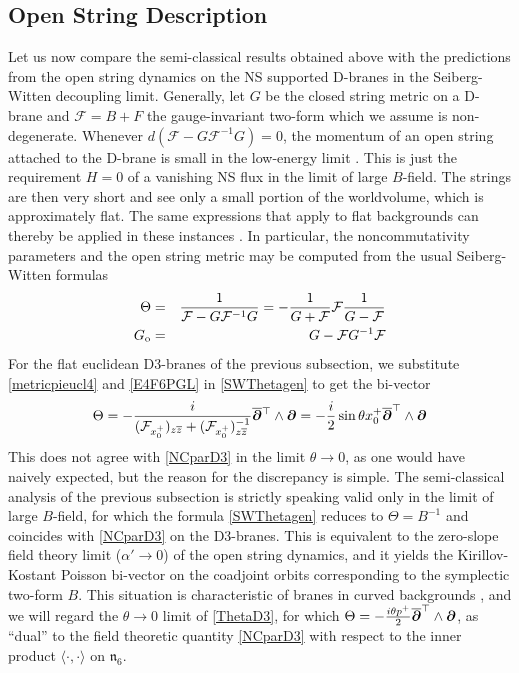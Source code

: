 \subsection{Open String Description}
\label{D3OSD}
Let us now compare the semi-classical results obtained above with the
predictions from the open string dynamics on the NS supported D-branes in the
Seiberg-Witten decoupling limit. Generally, let $G$ be the closed string metric
on a D-brane and $\mathcal{F}=B+F$ the gauge-invariant two-form which we assume
is non-degenerate. Whenever $ d(\mathcal{F}-G \mathcal{F}^{-1} G)=0$, the
momentum of an open string attached to the D-brane is small in the low-energy
limit \cite{HY1}. This is just the requirement $H=0$ of a vanishing NS flux in
the limit of large $B$-field. The strings are then very short and see only a
small portion of the worldvolume, which is approximately flat. The same
expressions that apply to flat backgrounds can thereby be applied in these
instances \cite{ARS1,HY1}. In particular, the noncommutativity parameters and
the open string metric may be computed from the usual Seiberg-Witten formulas
\cite{SW1}
\begin{eqnarray}
  \label{SWThetagen}
  \Theta&=&\frac1{\mathcal{F}-G \mathcal{F}^{-1} G} = -\frac1{G+\mathcal{F}}
  \mathcal{F} \frac1{G-\mathcal{F}}
  \\\label{SWopenmetgen}
  G_{\rm o}&=&G-\mathcal{F} G^{-1} \mathcal{F}
\end{eqnarray}
For the flat euclidean D3-branes of the previous subsection, we substitute
\eqref{metricpieucl4} and \eqref{E4F6PGL} in \eqref{SWThetagen} to get the
bi-vector
\begin{equation}
  \label{ThetaD3}
  \Theta=-\frac i{(\mathcal{F}_{x_0^+})_{z \overline{z}}+
    (\mathcal{F}_{x_0^+})^{-1}_{z \overline{z}}}
  \overline{{{\boldsymbol {\partial} }}}{}^{ \top}\wedge{{\boldsymbol {\partial} }}=
  -\frac i2 \sin\theta x_0^+ \overline{{{\boldsymbol {\partial} }}}^{ \top}
  \wedge{{\boldsymbol {\partial} }}
\end{equation}
This does not agree with \eqref{NCparD3} in the limit $\theta\to0$, as one would
have naively expected, but the reason for the discrepancy is simple. The
semi-classical analysis of the previous subsection is strictly speaking valid
only in the limit of large $B$-field, for which the formula \eqref{SWThetagen}
reduces to $\Theta=B^{-1}$ and coincides with \eqref{NCparD3} on the D3-branes.
This is equivalent to the zero-slope field theory limit ($\alpha'\to0$) of the
open string dynamics, and it yields the Kirillov-Kostant Poisson bi-vector on
the coadjoint orbits corresponding to the symplectic two-form $B$. This
situation is characteristic of branes in curved backgrounds \cite{ARS1,HY1}, and
we will regard the $\theta\to0$ limit of \eqref{ThetaD3}, for which
$\Theta=-\frac{ i\theta p^+}2 \overline{{{\boldsymbol {\partial} }}}^{ \top}\wedge{{\boldsymbol {\partial} }}$, as ``dual'' to
the field theoretic quantity \eqref{NCparD3} with respect to the inner product
$\langle \cdot , \cdot \rangle$ on $\mathfrak{n}_6$.

